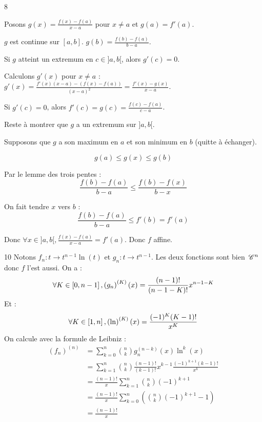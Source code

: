 \begin{correction}{8}

    Posons $g(x) = \frac{f(x)-f(a)}{x-a}$ pour $x \ne a$ et $g(a)=f'(a)$.

    $g$ est continue sur $[a,b]$.
    $g(b) = \frac{f(b)-f(a)}{b-a}$.

    Si $g$ atteint un extremum en $c \in ]a,b[$, alors $g'(c)=0$.

    Calculons $g'(x)$ pour $x \ne a$ : $g'(x) = \frac{f'(x)(x-a) - (f(x)-f(a))}{(x-a)^2} = \frac{f'(x)-g(x)}{x-a}$.

    Si $g'(c)=0$, alors $f'(c) = g(c) = \frac{f(c)-f(a)}{c-a}$.

    Reste à montrer que $g$ a un extremum sur $]a,b[$.

    Supposons que $g$ a son maximum en $a$ et son minimum en $b$ (quitte à échanger).
    
    $$g(a) \leqslant g(x) \leqslant g(b)$$

    Par le lemme des trois pentes :
    $$\frac{f(b) - f(a)}{b-a} \leqslant \frac{f(b) - f(x)}{b-x}$$

    On fait tendre $x$ vers $b$ :
    $$\frac{f(b) - f(a)}{b-a} \leqslant f'(b) = f'(a)$$

    Donc $\forall x \in ]a,b[, \frac{f(x) -f(a)}{x-a} = f'(a)$.
    Donc $f$ affine.
\end{correction}

\begin{correction}{10}
Notons $f_n: t \to t^{n-1} \ln(t)$ et $g_n: t \to t^{n-1}$.    
Les deux fonctions sont bien $\,\mathscr C^{n}$ donc $f$ l'est aussi.
On a :
\[\forall K \in \left[0, n-1\right], \left(g_n\right)^{(K)}(x) = \frac{(n-1)!}{(n-1-K)!}x^{n-1-K}\]
Et :
\[\forall K \in \left[1, n\right], \left(\ln\right)^{(K)}(x) = \frac{(-1)^K(K-1)!}{x^K}\]
On calcule avec la formule de Leibniz :
\begin{align*}
    \left(f_n\right)^{(n)} &= \sum_{k=0}^n \binom{n}{k} g_n^{(n-k)}(x) \ln^{k}(x) \\
    &= \sum_{k=1}^n \binom{n}{k} \frac{(n-1)!}{(k-1)!} x^{k-1} \frac{(-1)^{k+1}(k-1)!}{x^k} \\
    &= \frac{(n-1)!}{x} \sum_{k=1}^n \binom{n}{k} (-1)^{k+1} \\
    &= \frac{(n-1)!}{x} \sum_{k=0}^n \left(\binom{n}{k} (-1)^{k+1} -1\right)\\
    &= \frac{(n-1)!}{x}
\end{align*}
\end{correction}

